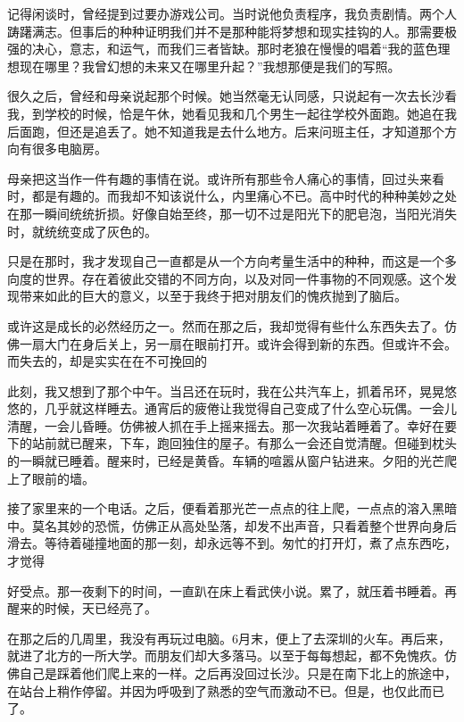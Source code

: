 \documentclass{article}
\begin{document}
记得闲谈时，曾经提到过要办游戏公司。当时说他负责程序，我负责剧情。两个人踌躇满志。但事后的种种证明我们并不是那种能将梦想和现实挂钩的人。那需要极强的决心，意志，和运气，而我们三者皆缺。那时老狼在慢慢的唱着“我的蓝色理想现在哪里？我曾幻想的未来又在哪里升起？”我想那便是我们的写照。


很久之后，曾经和母亲说起那个时候。她当然毫无认同感，只说起有一次去长沙看我，到学校的时候，恰是午休，她看见我和几个男生一起往学校外面跑。她追在我后面跑，但还是追丢了。她不知道我是去什么地方。后来问班主任，才知道那个方向有很多电脑房。

母亲把这当作一件有趣的事情在说。或许所有那些令人痛心的事情，回过头来看时，都是有趣的。而我却不知该说什么，内里痛心不已。高中时代的种种美妙之处在那一瞬间统统折损。好像自始至终，那一切不过是阳光下的肥皂泡，当阳光消失时，就统统变成了灰色的。

\newpage 



只是在那时，我才发现自己一直都是从一个方向考量生活中的种种，而这是一个多向度的世界。存在着彼此交错的不同方向，以及对同一件事物的不同观感。这个发现带来如此的巨大的意义，以至于我终于把对朋友们的愧疚抛到了脑后。

或许这是成长的必然经历之一。然而在那之后，我却觉得有些什么东西失去了。仿佛一扇大门在身后关上，另一扇在眼前打开。或许会得到新的东西。但或许不会。而失去的，却是实实在在不可挽回的


此刻，我又想到了那个中午。当吕还在玩时，我在公共汽车上，抓着吊环，晃晃悠悠的，几乎就这样睡去。通宵后的疲倦让我觉得自己变成了什么空心玩偶。一会儿清醒，一会儿昏睡。仿佛被人抓在手上摇来摇去。那一次我站着睡着了。幸好在要下的站前就已醒来，下车，跑回独住的屋子。有那么一会还自觉清醒。但碰到枕头的一瞬就已睡着。醒来时，已经是黄昏。车辆的喧嚣从窗户钻进来。夕阳的光芒爬上了眼前的墙。

接了家里来的一个电话。之后，便看着那光芒一点点的往上爬，一点点的溶入黑暗中。莫名其妙的恐慌，仿佛正从高处坠落，却发不出声音，只看着整个世界向身后滑去。等待着碰撞地面的那一刻，却永远等不到。匆忙的打开灯，煮了点东西吃，才觉得

\newpage 

好受点。那一夜剩下的时间，一直趴在床上看武侠小说。累了，就压着书睡着。再醒来的时候，天已经亮了。

在那之后的几周里，我没有再玩过电脑。6月末，便上了去深圳的火车。再后来，就进了北方的一所大学。而朋友们却大多落马。以至于每每想起，都不免愧疚。仿佛自己是踩着他们爬上来的一样。之后再没回过长沙。只是在南下北上的旅途中，在站台上稍作停留。并因为呼吸到了熟悉的空气而激动不已。但是，也仅此而已了。
\end{document}

